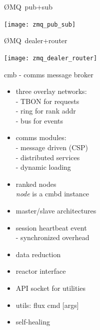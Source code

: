 \documentclass[default,pdf,colorBG,slideColor]{prosper}
\newcommand{\zMQ}{\O{}MQ}
\begin{document}
\begin{slide}{\zMQ\ pub+sub}{\small
\begin{center}
  \texttt{[image: zmq\_pub\_sub]}
\end{center}
}\end{slide}

\begin{slide}{\zMQ\ dealer+router}{\small
\begin{center}
  \texttt{[image: zmq\_dealer\_router]}
\end{center}
}\end{slide}



\begin{slide}{cmb - comms message broker}{\small
\begin{minipage}{0.50\textwidth}
\begin{itemize}
  \item{three overlay networks:\\
        - TBON for requests\\
        - ring for rank addr\\
        - bus for events}
  \item{comms modules:\\
        - message driven (CSP)\\
        - distributed services\\
        - dynamic loading}
  \item{ranked nodes\\
        {\em node} is a cmbd instance}
 \end{itemize}
\end{minipage}
\begin{minipage}{0.50\textwidth}
\begin{itemize}
  \item{master/slave architectures}
  \item{session heartbeat event\\
        - synchronized overhead}
  \item{data reduction}
  \item{reactor interface}
  \item{API socket for utilities}
  \item{utils: flux cmd [args]}
  \item{self-healing}
\end{itemize}
\end{minipage}
}\end{slide}
\end{document}
